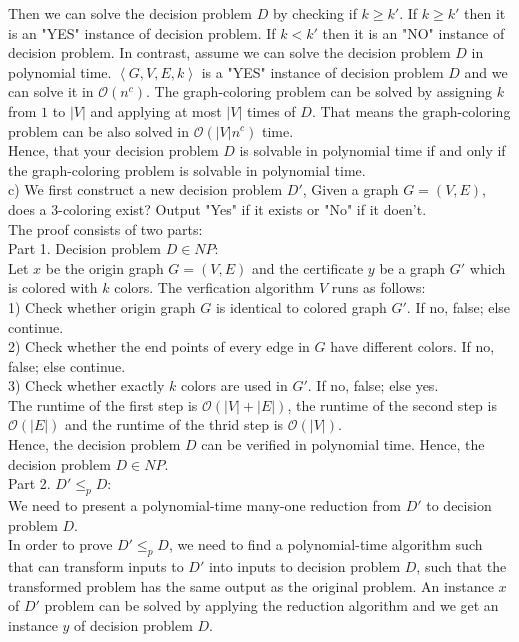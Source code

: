 \documentclass[12pt,letterpaper]{article}
\begin{document}
Then we can solve the decision problem $D$ by checking if $k \ge k'$.
If $k \ge k'$ then it is an "YES" instance of decision problem.
If $k < k'$ then it is an "NO" instance of decision problem.
In contrast, assume we can solve the decision problem $D$ in polynomial time.
$\left \langle G, V, E, k \right \rangle$ is a "YES" instance of decision problem $D$ and we can solve it in $\mathcal{O}(n^c)$.
The graph-coloring problem can be solved by assigning $k$ from $1$ to $|V|$ and applying at most $|V|$ times of $D$.
That means the graph-coloring problem can be also solved in $\mathcal{O}(|V|n^c)$ time. \\
Hence,  that your decision problem $D$ is solvable in polynomial time if and only if the graph-coloring problem is solvable in polynomial time. \\
c)
We first construct a new decision problem $D'$, Given a graph $G=(V,E)$, does a 3-coloring exist? Output "Yes" if it exists or "No" if it doen't. \\
The proof consists of two parts: \\
Part 1. Decision problem $D \in NP$: \\
Let $x$ be the origin graph $G=(V,E)$ and the certificate $y$ be a graph $G'$ which is colored with $k$ colors.
The verfication algorithm $V$ runs as follows: \\
1) Check whether origin graph $G$ is identical to colored graph $G'$. If no, false; else continue. \\
2) Check whether the end points of every edge in $G$ have different colors. If no, false; else continue. \\
3) Check whether exactly $k$ colors are used in $G'$. If no, false; else yes. \\
The runtime of the first step is $\mathcal{O}(|V|+|E|)$, the runtime of the second step is $\mathcal{O}(|E|)$ and the runtime of the thrid step is $\mathcal{O}(|V|)$. \\
Hence, the decision problem $D$ can be verified in polynomial time. Hence, the decision problem $D \in NP$. \\
Part 2. $D' \le_{p} D$: \\
We need to present a polynomial-time many-one reduction from $D'$ to decision problem $D$. \\
In order to prove $D' \le_{p} D$, we need to find a polynomial-time algorithm such that can transform inputs to $D'$ into inputs to decision problem $D$,
such that the transformed problem has the same output as the original problem.
An instance $x$ of $D'$ problem can be solved by applying the reduction algorithm and we get an instance $y$ of decision problem $D$.
\end{document}
